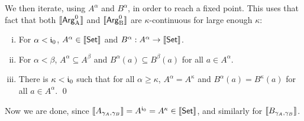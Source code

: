\documentclass{schwicht}
\begin{document}
  We then iterate, using $A^{\alpha}$ and $B^{\alpha}$, in order to
  reach a fixed point. This uses that fact that both $\llbracket \mathsf{Arg}^{0}_{\mathrm{A}} \rrbracket$
  and $\llbracket \mathsf{Arg}^{0}_{\mathrm{B}} \rrbracket$ are $\kappa$-continuous for large enough
  $\kappa$:

\begin{lemma} \mbox{}
\label{thm:A-in-Set}
  \begin{enumerate}[(i)]
  \item For $\alpha < \mathfrak{i}_0$, $A^{\alpha} \in \llbracket \mathsf{Set} \rrbracket$ and $B^{\alpha} :
    A^{\alpha} \to \llbracket \mathsf{Set} \rrbracket$. 
  \item For $\alpha < \beta$, $A^{\alpha} \subseteq A^{\beta}$ and  $B^{\alpha}(a) \subseteq
    B^{\beta}(a)$ for all $a \in A^{\alpha}$. 
  \item There is $\kappa < \mathfrak{i}_0$ such that for  all $\alpha \geq \kappa$,
    $A^{\alpha} = A^{\kappa}$ and $B^{\alpha}(a) =  B^{\kappa}(a)$ for all $a
    \in A^{\alpha}$. \qed 
  \end{enumerate}
\end{lemma}

Now we are done, since %
$\llbracket A_{\gamma_A, \gamma_B} \rrbracket = A^{\mathfrak{i}_0} = A^{\kappa} \in
\llbracket \mathsf{Set} \rrbracket$, and similarly for $\llbracket B_{\gamma_A, \gamma_B} \rrbracket$.



%
\end{document}
